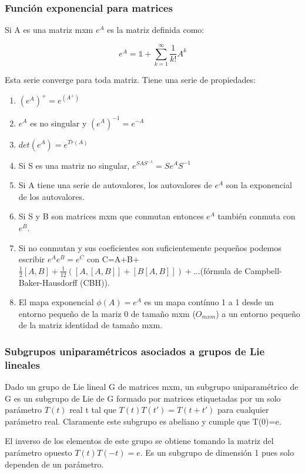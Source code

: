 \documentclass{article}
\begin{document}
     \subsubsection{Función exponencial para matrices}

     Si A es una matriz mxm $e^A$ es la matriz definida como:

     $$e^A=\mathds{1}+\sum _{k=1}^\infty \frac{1}{k!}A^k$$

     Esta serie converge para toda matriz. Tiene una serie de propiedades:

     \begin{enumerate}
         \item $(e^A)^+=e^{(A^+)}$
         \item $e^A$ es no singular y $(e^A)^{-1}=e^{-A}$
         \item $det(e^{A}) = e^{Tr(A)}$
         \item Si S es una matriz no singular, $e^{SAS^{-1}}=Se^{A}S^{-1}$
         \item Si A tiene una serie de autovalores, los autovalores de $e^{A}$ son la exponencial de los autovalores.
         \item Si S y B son matrices mxm que conmutan entonces $e^{A}$ también conmuta con $e^B$.
         \item Si no conmutan y sus coeficientes son suficientemente pequeños podemos escribir $e^Ae^B=e^C$ con C=A+B+$\frac{1}{2}[A,B]+\frac{1}{12}([A,[A,B]]+[B[A,B]])+... $(fórmula de Campbell-Baker-Hausdorff (CBH)).
         \item El mapa exponencial $\phi (A)=e^A$ es un mapa contínuo 1 a 1 desde un entorno pequeño de la mariz 0 de tamaño mxm ($O_{mxm}$) a un entorno pequeño de la matriz identidad de tamaño mxm.
     \end{enumerate}

     \subsubsection{Subgrupos uniparamétricos asociados a grupos de Lie lineales}

     Dado un grupo de Lie lineal G de matrices mxm, un subgrupo uniparamétrico de G es un subgrupo de Lie de G formado por matrices etiquetadas por un solo parámetro $T(t)$ real t tal que $T(t)T(t')=T(t+t')$ para cualquier parámetro real. Claramente este subgrupo es abeliano y cumple que T(0)=e.

     \smallskip
     El inverso de los elementos de este grupo se obtiene tomando la matriz del parámetro opuesto $T(t)T(-t)=e$. Es un subgrupo de dimensión 1 pues solo dependen de un parámetro.
\end{document}
